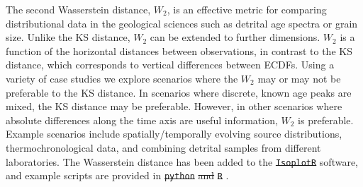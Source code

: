 \documentclass[gchron, manuscript]{copernicus}
\providecommand{\DIFaddtex}[1]{{\protect\color{blue}\uwave{#1}}} %
\providecommand{\DIFdeltex}[1]{{\protect\color{red}\sout{#1}}}                      %
\providecommand{\DIFaddbegin}{} %
\providecommand{\DIFaddend}{} %
\providecommand{\DIFdelbegin}{} %
\providecommand{\DIFdelend}{} %
\providecommand{\DIFadd}[1]{\texorpdfstring{\DIFaddtex{#1}}{#1}} %
\providecommand{\DIFdel}[1]{\texorpdfstring{\DIFdeltex{#1}}{}} %
\begin{document}
The second Wasserstein distance, $W_2$, is an effective metric for comparing distributional data in the geological sciences such as detrital age spectra or grain size. Unlike the KS distance, $W_2$ can be extended to further dimensions. $W_2$ is a function of the horizontal distances between observations, in contrast to the KS distance, which corresponds to vertical differences between ECDFs. 
Using a variety of case studies we explore scenarios where the $W_2$ may or may not be preferable to the KS distance. In scenarios where discrete, known age peaks are mixed, the KS distance may be preferable. However, in other scenarios where absolute differences along the time axis are useful information, $W_2$ is preferable. Example scenarios include spatially/temporally evolving source distributions, thermochronological data, and combining detrital samples from different laboratories. The Wasserstein distance has been added to the \DIFdelbegin \texttt{\DIFdel{IsoplotR}} %
\DIFdelend \DIFaddbegin \DIFadd{IsoplotR }\DIFaddend software, and example scripts are provided in \DIFdelbegin \texttt{\DIFdel{python}} %
\DIFdel{and }\texttt{\DIFdel{R}}%
\DIFdelend \DIFaddbegin \DIFadd{Python and R}\DIFaddend . 



\DIFdelbegin %
\DIFdelend \DIFaddbegin {} \DIFaddend %


\end{document}
